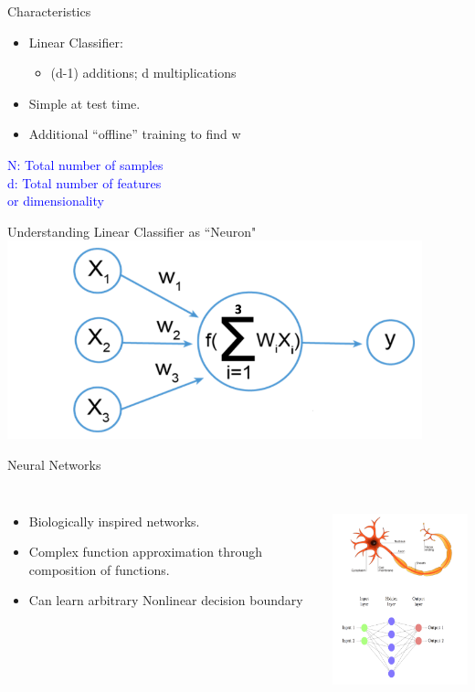 \documentclass[aspectratio=169, 14pt,usenames,dvipsnames]{beamer}
\begin{document}
\begin{frame}{Characteristics}

	\begin{itemize}
		\item \alert{Linear Classifier:}
			\begin{itemize}
				\item \alert{(d-1)} additions; \alert{d} multiplications
			\end{itemize}
		\item Simple at test  time.
		\item Additional \enquote{offline} training to find w
	\end{itemize}

	\hspace{6cm} \textcolor{blue}{N: Total number of samples \\ \hspace{6cm}  d: Total number of features \\ \hspace{6cm} or dimensionality}
\end{frame}

\begin{frame}{Understanding Linear Classifier as ``Neuron"}
\centering
\includegraphics[width=0.9\textwidth, height=0.7\textheight]{Images/13lcla.png}
\end{frame}

\begin{frame}{Neural Networks}
\begin{columns}
\begin{itemize}
\item Biologically inspired networks.
\item Complex function approximation through composition of functions.
\item Can learn arbitrary Nonlinear decision boundary
\end{itemize} 
\includegraphics[width=5.2cm,height=5.75cm]{Images/14lcla.png}
\end{columns}
\end{frame}
\end{document}
